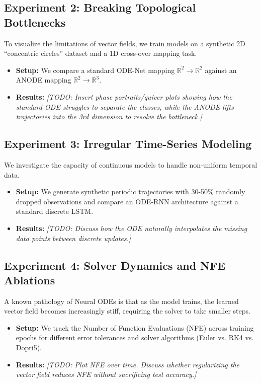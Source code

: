 \documentclass{article}
\begin{document}
\subsection{Experiment 2: Breaking Topological Bottlenecks}
To visualize the limitations of vector fields, we train models on a synthetic 2D ``concentric circles'' dataset and a 1D cross-over mapping task.
\begin{itemize}
    \item \textbf{Setup:} We compare a standard ODE-Net mapping $\mathbb{R}^2 \to \mathbb{R}^2$ against an ANODE mapping $\mathbb{R}^2 \to \mathbb{R}^3$.
    \item \textbf{Results:} \textit{[TODO: Insert phase portraits/quiver plots showing how the standard ODE struggles to separate the classes, while the ANODE lifts trajectories into the 3rd dimension to resolve the bottleneck.]}
\end{itemize}

\subsection{Experiment 3: Irregular Time-Series Modeling}
We investigate the capacity of continuous models to handle non-uniform temporal data.
\begin{itemize}
    \item \textbf{Setup:} We generate synthetic periodic trajectories with 30-50\% randomly dropped observations and compare an ODE-RNN architecture against a standard discrete LSTM.
    \item \textbf{Results:} \textit{[TODO: Discuss how the ODE naturally interpolates the missing data points between discrete updates.]}
\end{itemize}

\subsection{Experiment 4: Solver Dynamics and NFE Ablations}
A known pathology of Neural ODEs is that as the model trains, the learned vector field becomes increasingly stiff, requiring the solver to take smaller steps.
\begin{itemize}
    \item \textbf{Setup:} We track the Number of Function Evaluations (NFE) across training epochs for different error tolerances and solver algorithms (Euler vs. RK4 vs. Dopri5).
    \item \textbf{Results:} \textit{[TODO: Plot NFE over time. Discuss whether regularizing the vector field reduces NFE without sacrificing test accuracy.]}
\end{itemize}
\end{document}
